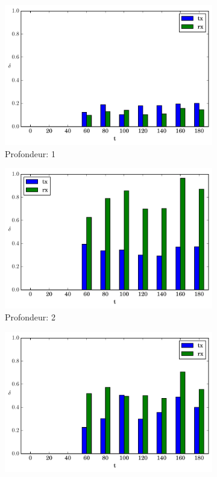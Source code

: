 \begin{figure}[h]
  \centering
  \begin{subfigure}{0.3\textwidth}
    \includegraphics[width=\textwidth]{img/evolution_route_1.pdf}
    \caption{Profondeur: 1}
    \label{supervision:fig:route_1}
  \end{subfigure}
  \begin{subfigure}{0.3\textwidth}
    \includegraphics[width=\textwidth]{img/evolution_route_2.pdf}
    \caption{Profondeur: 2}
    \label{supervision:fig:route_2}
  \end{subfigure}
  \begin{subfigure}{0.3\textwidth}
    \includegraphics[width=\textwidth]{img/evolution_route_3.pdf}

\end{subfigure}
\end{figure}
